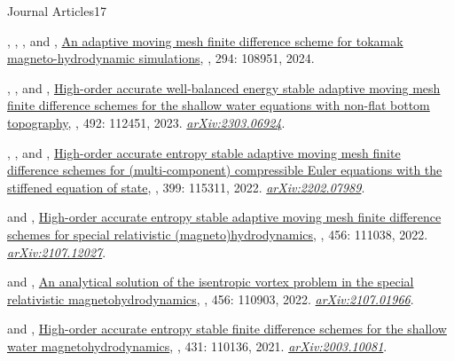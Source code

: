 \begin{cvpublicationsection}{Journal Articles}{17}
%
\item {}, , , and , \href{https://doi.org/10.1016/j.cpc.2023.108951}{An adaptive moving mesh finite difference scheme for tokamak magneto-hydrodynamic simulations}, , 294: 108951, 2024.
%
\item {}, , and , \href{https://doi.org/10.1016/j.jcp.2023.112451}{High-order accurate well-balanced energy stable adaptive moving mesh finite difference schemes for the shallow water equations with non-flat bottom topography}, , 492: 112451, 2023. \href{https://arxiv.org/abs/2303.06924}{\em arXiv:2303.06924}.
%
\item {}, , and , \href{https://doi.org/10.1016/j.cma.2022.115311}{High-order accurate entropy stable adaptive moving mesh finite difference schemes for (multi-component) compressible Euler equations with the stiffened equation of state}, , 399: 115311, 2022. \href{https://arxiv.org/abs/2202.07989}{\em arXiv:2202.07989}.
%
\item {} and , \href{https://doi.org/10.1016/j.jcp.2022.111038}{High-order accurate entropy stable adaptive moving mesh finite difference schemes for special relativistic (magneto)hydrodynamics}, , 456: 111038, 2022. \href{https://arxiv.org/abs/2107.12027}{\em arXiv:2107.12027}.
%
\item {} and , \href{https://doi.org/10.1016/j.jcp.2021.110903}{An analytical solution of the isentropic vortex problem in the special relativistic magnetohydrodynamics}, , 456: 110903, 2022. \href{https://arxiv.org/abs/2107.01966}{\em arXiv:2107.01966}.
%
\item {} and , \href{https://doi.org/10.1016/j.jcp.2021.110136}{High-order accurate entropy stable finite difference schemes for the shallow water magnetohydrodynamics}, , 431: 110136, 2021. \href{https://arxiv.org/abs/2003.10081}{\em arXiv:2003.10081}.

\end{cvpublicationsection}
